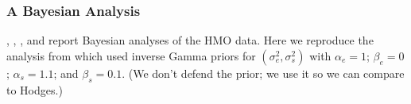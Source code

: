 \documentclass{report}
\newcommand{\RLorig}{\text{RL}}
\newcommand{\logRLorig}{\log\RLorig}
\newcommand{\sigssq}{\sigma_s^2}
\newcommand{\sigesq}{\sigma_e^2}
\begin{document}

\subsubsection{A Bayesian Analysis}
 \cite{hodges:98}, \cite{wakefield:1998}, \cite{hodges:2013}, and \cite{henn&hodges:2014} report  Bayesian analyses of the HMO data.  Here we reproduce the analysis from \cite{hodges:98} which used inverse Gamma priors for $(\sigesq,\sigssq)$ with $\alpha_e = 1$; $\beta_e = 0$; $\alpha_s = 1.1$; and $\beta_s =0.1$.  (We don't defend the prior; we use it so we can compare to Hodges.)
\end{document}

